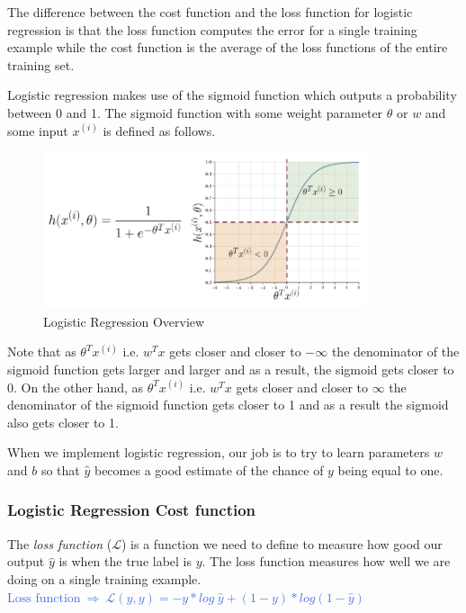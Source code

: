 \documentclass[letterpaper,12pt,notitlepage,twoside]{report}
\begin{document}
\begin{example}
     The difference between the cost function and the loss function for logistic regression is that the loss function computes the error for a single training example while the cost function is the average of the loss functions of the entire training set. 
\end{example}

Logistic regression makes use of the sigmoid function which outputs a probability between 0 and 1. The sigmoid function with some weight parameter $\theta$ or $w$ and some input $x^{(i)}$ is defined as follows. 

\begin{figure}[h]
	\centering
	\includegraphics[width=0.85\textwidth]{Images/Logistic with sigmoid fxn.png}
	\caption{Logistic Regression Overview}
	\label{fig:7}
\end{figure}

Note that as $\theta^T x^{(i)}$ i.e.  $w^Tx$ gets closer and closer to $-\infty$ the denominator of the sigmoid function gets larger and larger and as a result, the sigmoid gets closer to 0.  On the other hand, as $\theta^T x^{(i)}$ i.e.  $w^Tx$ gets closer and closer to $\infty$ the denominator of the sigmoid function gets closer to 1 and as a result the sigmoid also gets closer to 1. 

\begin{example}
    When we implement logistic regression,  our job is to try to learn parameters $w$ and $b$ so that $\hat{y}$ becomes a good estimate of the chance of $y$ being equal to one. 
\end{example}

\subsubsection{Logistic Regression Cost function}

The \emph{loss function} ($\mathcal{L}$) is a function we need to define to measure how good our output $\hat{y}$ is when the true label is $y$. The loss function measures how well we are doing on a single training example. \\
\textcolor{RoyalBlue}{$\text{Loss function}~ \Rightarrow~ \mathcal{L}(\hat{y}, y) = - y*log~\hat{y} + (1 - y)*log(1 - \hat{y})$}
\end{document}
